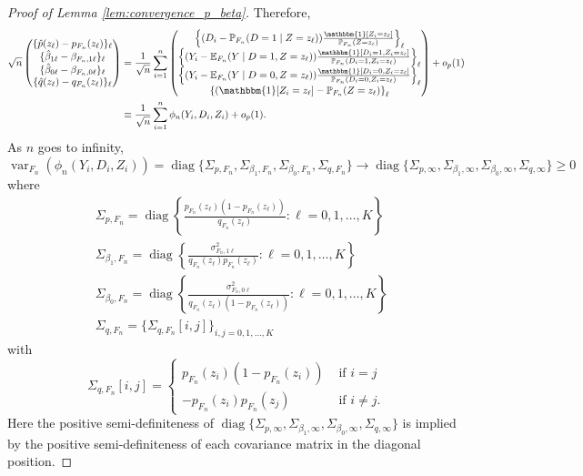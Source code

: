 \documentclass[11pt]{article}
\theoremstyle{definition}
\DeclareMathOperator*{\diag}{diag}
\DeclareMathOperator{\var}{var}
\newcommand{\Exp}{\ensuremath{\mathbb{E}}} %
\newcommand{\Prob}{\ensuremath{\mathbb{P}}} %
\newcommand{\0}{\ensuremath{\mathbf{0}}}
\newcommand{\indicator}{\ensuremath{\mathbbm{1}}}
\begin{document}
\begin{bibunit}
\begin{proof}[Proof of Lemma \ref{lem:convergence_p_beta}]
	Therefore, 
	\begin{align*}
		\sqrt{n}
		\begin{pmatrix}
			\{\hat{p}(z_\ell) - p_{F_n}(z_\ell)\}_{\ell} \\
			\{\hat{\beta}_{1\ell} - \beta_{F_n,1\ell}\}_{\ell} \\
			\{\hat{\beta}_{0\ell} - \beta_{F_n,0\ell}\}_{\ell} \\
			\{\hat{q}(z_\ell) - q_{F_n}(z_\ell)\}_{\ell}
		\end{pmatrix}	
		&= 
		\frac{1}{\sqrt{n}} \sum_{i=1}^n 
		\begin{pmatrix}
			\left\{(D_i - \Prob_{F_n}(D=1\mid Z=z_\ell))\frac{\indicator[Z_i = z_\ell]}{\Prob_{F_n}(Z = z_\ell)}\right\}_{\ell} \\
			\left\{(Y_i - \Exp_{F_n}(Y\mid D=1, Z=z_\ell)) \frac{\indicator[D_i = 1, Z_i = z_\ell]}{\Prob_{F_n}(D_i = 1, Z_i=z_\ell)}\right\}_{\ell} \\
			\left\{(Y_i - \Exp_{F_n}(Y\mid D=0, Z=z_\ell)) \frac{\indicator[D_i = 0, Z_i = z_\ell]}{\Prob_{F_n}(D_i = 0, Z_i=z_\ell)}\right\}_{\ell} \\
			\left\{(\indicator[Z_i = z_\ell] - \Prob_{F_n}(Z=z_\ell)\right\}_{\ell}
		\end{pmatrix} + o_p(1) \\
		&\equiv
		\frac{1}{\sqrt{n}} \sum_{i=1}^n \phi_n(Y_i, D_i, Z_i) + o_p(1).
	\end{align*}
As $n$ goes to infinity, 
	\[
		\var_{F_n}(\phi_n(Y_i,D_i,Z_i))
		=
		\diag\{\Sigma_{p,F_n}, \Sigma_{\beta_1,F_n}, \Sigma_{\beta_0,F_n}, \Sigma_{q,F_n}\}	
		\to
		\diag\{\Sigma_{p,\infty}, \Sigma_{\beta_1,\infty}, \Sigma_{\beta_0,\infty}, \Sigma_{q,\infty}\}
	    \geq 
            0
        \]
	where 
	\begin{align*}
		& \Sigma_{p,F_n} = \diag\left\{\frac{p_{F_n}(z_\ell)(1-p_{F_n}(z_\ell))}{q_{F_n}(z_\ell)}: \ell = 0,1,\ldots,K\right\} \\
		& \Sigma_{\beta_1, F_n} = \diag\left\{\frac{\sigma^2_{F_n, 1\ell}}{q_{F_n}(z_\ell)p_{F_n}(z_\ell)}: \ell = 0,1,\ldots, K\right\} \\
		& \Sigma_{\beta_0, F_n} = \diag\left\{\frac{\sigma^2_{F_n, 0\ell}}{q_{F_n}(z_\ell)(1- p_{F_n}(z_\ell))}: \ell = 0,1,\ldots, K\right\} \\
		& \Sigma_{q,F_n} = \{\Sigma_{q,F_n}[i,j]\}_{i,j = 0,1,\ldots,K}
	\end{align*}
        with
        \[
            \Sigma_{q,F_n}[i,j] = 
            \begin{cases}
                p_{F_n}(z_i) (1 - p_{F_n}(z_i)) & \text{ if } i = j \\
                -p_{F_n}(z_i)p_{F_n}(z_j)       & \text{ if } i \neq j.
            \end{cases}
        \]
	Here the positive semi-definiteness of $\diag\{\Sigma_{p,\infty}, \Sigma_{\beta_1,\infty}, \Sigma_{\beta_0,\infty}, \Sigma_{q,\infty}\}$ is implied by the positive semi-definiteness of each covariance matrix in the diagonal position.


\end{proof}
\end{bibunit}
\end{document}
